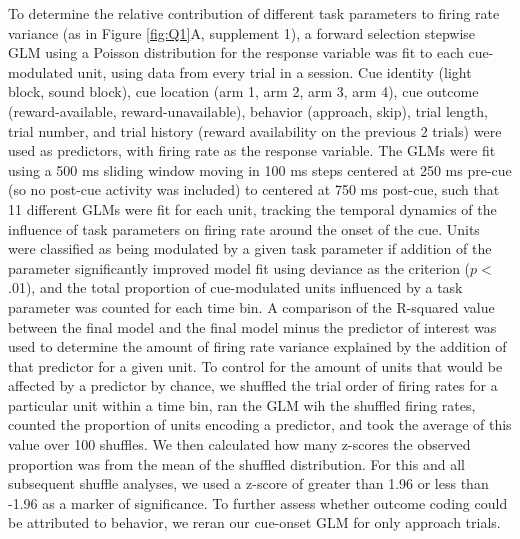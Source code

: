 \documentclass[11pt]{article}
\begin{document}
To determine the relative contribution of different task parameters to firing rate variance (as in Figure \ref{fig:Q1}A, supplement 1), a forward selection stepwise GLM using a Poisson distribution for the response variable was fit to each cue-modulated unit, using data from every trial in a session. Cue identity (light block, sound block), cue location (arm 1, arm 2, arm 3, arm 4), cue outcome (reward-available, reward-unavailable), behavior (approach, skip), trial length, trial number, and trial history (reward availability on the previous 2 trials) were used as predictors, with firing rate as the response variable. The GLMs were fit using a 500 ms sliding window moving in 100 ms steps centered at 250 ms pre-cue (so no post-cue activity was included) to centered at 750 ms post-cue, such that 11 different GLMs were fit for each unit, tracking the temporal dynamics of the influence of task parameters on firing rate around the onset of the cue. Units were classified as being modulated by a given task parameter if addition of the parameter significantly improved model fit using deviance as the criterion ($p <$ .01), and the total proportion of cue-modulated units influenced by a task parameter was counted for each time bin. A comparison of the R-squared value between the final model and the final model minus the predictor of interest was used to determine the amount of firing rate variance explained by the addition of that predictor for a given unit. To control for the amount of units that would be affected by a predictor by chance, we shuffled the trial order of firing rates for a particular unit within a time bin, ran the GLM wih the shuffled firing rates, counted the proportion of units encoding a predictor, and took the average of this value over 100 shuffles. We then calculated how many z-scores the observed proportion was from the mean of the shuffled distribution. For this and all subsequent shuffle analyses, we used a z-score of greater than 1.96 or less than -1.96 as a marker of significance. To further assess whether outcome coding could be attributed to behavior, we reran our cue-onset GLM for only approach trials.
\end{document}
